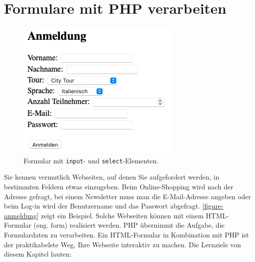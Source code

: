 \toggletrue{image}
\toggletrue{imagehover}

\chapter{Formulare mit \ac{PHP} verarbeiten}
\label{chapter-formulare-php}

\begin{figure}
\vspace{-\baselineskip}
\centering
\includegraphics[scale=0.55]{anmeldung}
\caption{Formular mit \lstinline{input}- und \lstinline{select}-Elementen.}
\label{figure-anmeldung}
\end{figure}

Sie kennen vermutlich Webseiten, auf denen Sie aufgefordert werden, in bestimmten Feldern etwas einzugeben. Beim Online-Shopping wird nach der Adresse gefragt, bei einem Newsletter muss man die E-Mail-Adresse angeben oder beim Log-in wird der Benutzername und das Passwort abgefragt. \autoref{figure-anmeldung} zeigt ein Beispiel. Solche Webseiten können mit einem \ac{HTML}-Formular (eng. form) realisiert werden. \ac{PHP} übernimmt die Aufgabe, die Formulardaten zu verarbeiten. Ein \ac{HTML}-Formular in Kombination mit \ac{PHP} ist der praktikabelste Weg, Ihre Webseite interaktiv zu machen. Die Lernziele von diesem Kapitel lauten:

\newcommand{\formulareMitPhpVerarbeitenLernziele}{
\protect\begin{todolist}
\item Sie verarbeiten Formulardaten mit \ac{PHP}.
\end{todolist}
}

